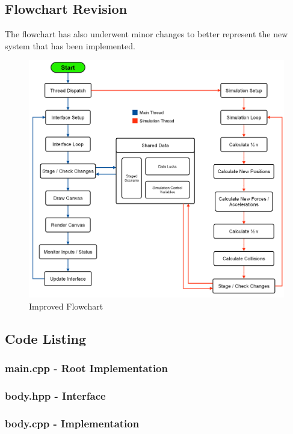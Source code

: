 \pagebreak
\subsection{Flowchart Revision}
The flowchart has also underwent minor changes to better represent the new system that has been implemented.

\begin{figure}[!ht]
  \centering
  \includegraphics[scale=1]{../img/flowchartNew.png} 
  \caption{Improved Flowchart}
\end{figure}

\pagebreak
\subsection{Code Listing}
\subsubsection{main.cpp - Root Implementation}
\texttt{} 
\pagebreak
\subsubsection{body.hpp - Interface}
\texttt{} 
\pagebreak
\subsubsection{body.cpp - Implementation}
\texttt{} 
\pagebreak
